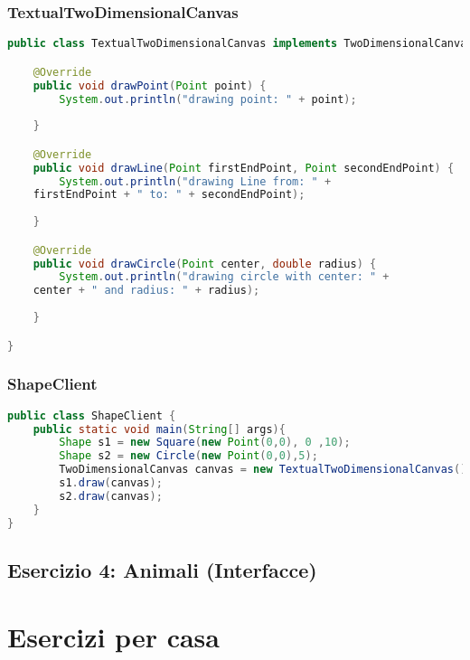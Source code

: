 \documentclass{article}
\begin{document}
\subsubsection{TextualTwoDimensionalCanvas}
\begin{lstlisting}[language=Java,escapechar=|]
public class TextualTwoDimensionalCanvas implements TwoDimensionalCanvas{

	@Override
	public void drawPoint(Point point) {
		System.out.println("drawing point: " + point);
		
	}

	@Override
	public void drawLine(Point firstEndPoint, Point secondEndPoint) {
		System.out.println("drawing Line from: " + 
	firstEndPoint + " to: " + secondEndPoint);
		
	}

	@Override
	public void drawCircle(Point center, double radius) {
		System.out.println("drawing circle with center: " + 
	center + " and radius: " + radius);
		
	}

}
\end{lstlisting}
\subsubsection{ShapeClient}
\begin{lstlisting}[language=Java,escapechar=|]
public class ShapeClient {
	public static void main(String[] args){
		Shape s1 = new Square(new Point(0,0), 0 ,10);
		Shape s2 = new Circle(new Point(0,0),5);
		TwoDimensionalCanvas canvas = new TextualTwoDimensionalCanvas();
		s1.draw(canvas);
		s2.draw(canvas);
	}
}
\end{lstlisting}

\subsection{Esercizio 4: Animali (Interfacce)}
\section{Esercizi per casa}

\clearpage







\nocite{*}
\end{document}
